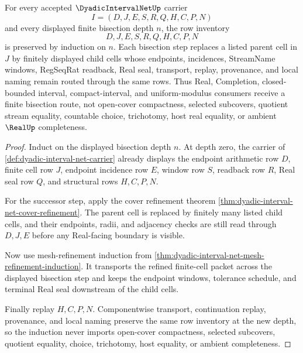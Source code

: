 \begin{theorem}
\label{thm:dyadic-interval-net-finite-bisection-induction-route}
For every accepted $\DyadicIntervalNetUp$ carrier
$$
I=(D,J,E,S,R,Q,H,C,P,N)
$$
and every displayed finite bisection depth $n$, the row inventory
$$
D,J,E,S,R,Q,H,C,P,N
$$
is preserved by induction on $n$. Each bisection step replaces a listed parent cell in $J$ by finitely displayed child cells whose endpoints, incidences, StreamName windows, RegSeqRat readback, Real seal, transport, replay, provenance, and local naming remain routed through the same rows. Thus Real, Completion, closed-bounded interval, compact-interval, and uniform-modulus consumers receive a finite bisection route, not open-cover compactness, selected subcovers, quotient stream equality, countable choice, trichotomy, host real equality, or ambient $\RealUp$ completeness.
\end{theorem}
\begin{proof}
Induct on the displayed bisection depth $n$. At depth zero, the carrier of \autoref{def:dyadic-interval-net-carrier} already displays the endpoint arithmetic row $D$, finite cell row $J$, endpoint incidence row $E$, window row $S$, readback row $R$, Real seal row $Q$, and structural rows $H,C,P,N$.

For the successor step, apply the cover refinement theorem \autoref{thm:dyadic-interval-net-cover-refinement}. The parent cell is replaced by finitely many listed child cells, and their endpoints, radii, and adjacency checks are still read through $D,J,E$ before any Real-facing boundary is visible.

Now use mesh-refinement induction from \autoref{thm:dyadic-interval-net-mesh-refinement-induction}. It transports the refined finite-cell packet across the displayed bisection step and keeps the endpoint windows, tolerance schedule, and terminal Real seal downstream of the child cells.

Finally replay $H,C,P,N$. Componentwise transport, continuation replay, provenance, and local naming preserve the same row inventory at the new depth, so the induction never imports open-cover compactness, selected subcovers, quotient equality, choice, trichotomy, host equality, or ambient completeness.
\end{proof}

